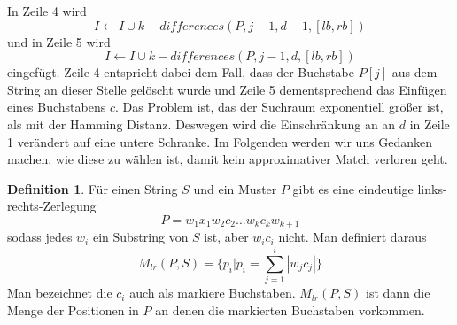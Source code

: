 \documentclass[a4paper, 12pt]{article}
\theoremstyle{plain}
\theoremstyle{definition}
\newtheorem{definition}[theorem]{Definition} %
\theoremstyle{lemma}
\theoremstyle{remark}
\theoremstyle{corollary}
\theoremstyle{example}
\begin{document}
	In Zeile 4 wird \[I \gets I \cup k-differences(P,j-1,d-1,[lb,rb])\] und in Zeile 5 wird \[I \gets I \cup k-differences(P,j-1,d,[lb,rb])\] eingefügt. Zeile 4 entspricht dabei dem Fall, dass der Buchstabe $P[j]$ aus dem String an dieser Stelle gelöscht wurde und Zeile 5 dementsprechend das Einfügen eines Buchstabens $c$. Das Problem ist, das der Suchraum exponentiell größer ist, als mit der Hamming Distanz. Deswegen wird die Einschränkung an an $d$ in Zeile 1 verändert auf eine untere Schranke. Im Folgenden werden wir uns Gedanken machen, wie diese zu wählen ist, damit kein approximativer Match verloren geht.
	\begin{definition}
		Für einen String $S$ und ein Muster $P$ gibt es eine eindeutige links-rechts-Zerlegung \[P = w_1x_1w_2c_2...w_kc_kw_{k+1}\] sodass jedes $w_i$ ein Substring von $S$ ist, aber $w_ic_i$ nicht. Man definiert daraus \[M_{lr}(P,S) = \{p_i | p_i = \sum_{j=1}^{i}\left|w_jc_j\right|\}\] Man bezeichnet die $c_i$ auch als markiere Buchstaben. $M_{lr}(P,S)$ ist dann die Menge der Positionen in $P$ an denen die markierten Buchstaben vorkommen.
	\end{definition}
\end{document}
